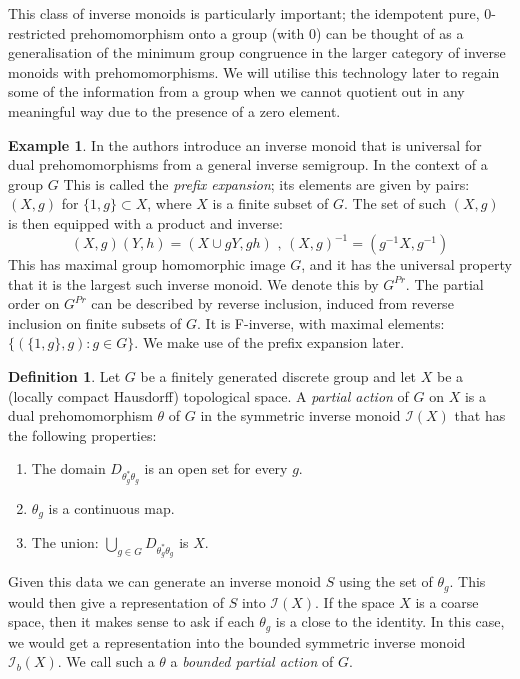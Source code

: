 \documentclass[11pt,]{amsbook}
\theoremstyle{plain}
\theoremstyle{definition}%
\newtheorem{definition}[theorem]{Definition}%
\newtheorem{example}[theorem]{Example}%
\theoremstyle{remark}%
\begin{document}
This class of inverse monoids is particularly important; the idempotent pure, 0-restricted prehomomorphism onto a group (with 0) can be thought of as a generalisation of the minimum group congruence in the larger category of inverse monoids with prehomomorphisms. We will utilise this technology later to regain some of the information from a group when we cannot quotient out in any meaningful way due to the presence of a zero element.

\begin{example}
In \cite{MR745358,MR2221438} the authors introduce an inverse monoid that is universal for dual prehomomorphisms from a general inverse semigroup. In the context of a group $G$ This is called the \textit{prefix expansion}; its elements are given by pairs: $(X,g)$ for $\lbrace 1,g\rbrace \subset X$, where $X$ is a finite subset of $G$. The set of such $(X,g)$ is then equipped with a product and inverse:
\begin{equation*}
(X,g)(Y,h) = (X\cup gY,gh)\mbox{ , } (X,g)^{-1}=(g^{-1}X,g^{-1})
\end{equation*}
This has maximal group homomorphic image $G$, and it has the universal property that it is the largest such inverse monoid. We denote this by $G^{Pr}$. The partial order on $G^{Pr}$ can be described by reverse inclusion, induced from reverse inclusion on finite subsets of $G$. It is F-inverse, with maximal elements: $\lbrace(\lbrace 1,g \rbrace, g):g \in G \rbrace$. We make use of the prefix expansion later.
\end{example}

\begin{definition}
Let $G$ be a finitely generated discrete group and let $X$ be a (locally compact Hausdorff) topological space. A \textit{partial action} of $G$ on $X$ is a dual prehomomorphism $\theta$ of $G$ in the symmetric inverse monoid $\mathcal{I}(X)$ that has the following properties:
\begin{enumerate}
\item The domain $D_{\theta_{g}^{*}\theta_{g}}$ is an open set for every $g$.
\item $\theta_{g}$ is a continuous map.
\item The union: $\bigcup_{g \in G}D_{\theta_{g}^{*}\theta_{g}}$ is $X$.
\end{enumerate}
\end{definition}

Given this data we can generate an inverse monoid $S$ using the set of $\theta_{g}$. This would then give a representation of $S$ into $\mathcal{I}(X)$. If the space $X$ is a coarse space, then it makes sense to ask if each $\theta_{g}$ is a close to the identity. In this case, we would get a representation into the bounded symmetric inverse monoid $\mathcal{I}_{b}(X)$. We call such a $\theta$ a \textit{bounded partial action} of $G$.
\end{document}
